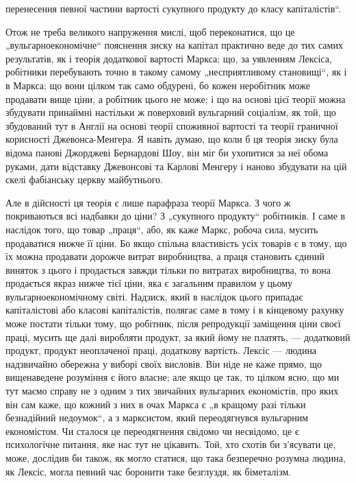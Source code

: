 \parcont{}  %
перенесення певної частини вартості сукупного продукту до
класу капіталістів“.

Отож не треба великого напруження мислі, щоб переконатися,
що це „вульгарноекономічне“ пояснення зиску на капітал
практично веде до тих самих результатів, як і теорія додаткової
вартості Маркса; що, за уявленням Лексіса, робітники
перебувають точно в такому самому „несприятливому становищі“,
як і в Маркса; що вони цілком так само обдурені, бо
кожен неробітник може продавати вище ціни, а робітник цього
не може; і що на основі цієї теорії можна збудувати принаймні
настільки ж поверховий вульгарний соціалізм, як той, що збудований
тут в Англії на основі теорії споживної вартості та
теорії граничної корисності Джевонса-Менгера. Я навіть думаю,
що коли б ця теорія зиску була відома панові Джорджеві Бернардові
Шоу, він міг би ухопитися за неї обома руками, дати
відставку Джевонсові та Карлові Менгеру і наново збудувати
на цій скелі фабіанську церкву майбутнього.

Але в дійсності ця теорія є лише парафраза теорії Маркса.
З чого ж покриваються всі надбавки до ціни? З „сукупного
продукту“ робітників. І саме в наслідок того, що товар „праця“,
або, як каже Маркс, робоча сила, мусить продаватися нижче її
ціни. Бо якщо спільна властивість усіх товарів є в тому, що їх
можна продавати дорожче витрат виробництва, а праця становить
єдиний виняток з цього і продається завжди тільки по витратах
виробництва, то вона продається якраз нижче тієї ціни, яка є
загальним правилом у цьому вульгарноекономічному світі. Надзиск,
який в наслідок цього припадає капіталістові або класові
капіталістів, полягає саме в тому і в кінцевому рахунку може
постати тільки тому, що робітник, після репродукції заміщення
ціни своєї праці, мусить ще далі виробляти продукт, за який
йому не платять, — додатковий продукт, продукт неоплаченої
праці, додаткову вартість. Лексіс — людина надзвичайно обережна
у виборі своїх висловів. Він ніде не каже прямо, що
вищенаведене розуміння є його власне; але якщо це так, то
цілком ясно, що ми тут маємо справу не з одним з тих звичайних
вульгарних економістів, про яких він сам каже, що кожний
з них в очах Маркса є „в кращому разі тільки безнадійний недоумок“,
а з марксистом, який переодягнувся вульгарним економістом.
Чи сталося це переодягнення свідомо чи несвідомо, це
є психологічне питання, яке нас тут не цікавить. Той, хто схотів
би з’ясувати це, може, дослідив би також, як могло статися, що
така безперечно розумна людина, як Лексіс, могла певний час
боронити таке безглуздя, як біметалізм.

